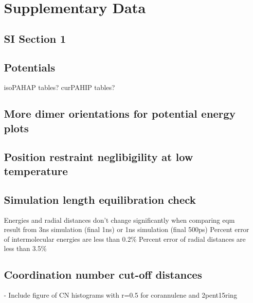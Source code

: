 \section{Supplementary Data}
\label{supplinfo}
%
\subsection{SI Section 1}

\subsection{Potentials}
isoPAHAP tables?
curPAHIP tables?

\subsection{More dimer orientations for potential energy plots}

\subsection{Position restraint neglibigility at low temperature}

\subsection{Simulation length equilibration check}
Energies and radial distances don't change significantly when comparing eqm result from 3ns simulation (final 1ns) or 1ns simulation (final 500ps)
Percent error of intermolecular energies are less than 0.2\%
Percent error of radial distances are less than 3.5\%


\subsection{Coordination number cut-off distances}
- Include figure of CN histograms with r=0.5 for corannulene and 2pent15ring


\newpage